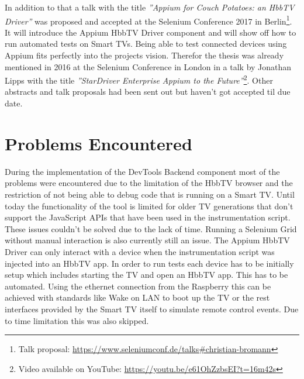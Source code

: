 In addition to that a talk with the title \textit{''Appium for Couch Potatoes: an HbbTV Driver''} was proposed and
accepted at the Selenium Conference 2017 in Berlin\footnote{Talk proposal: \url{https://www.seleniumconf.de/talks\#christian-bromann}}.
It will introduce the Appium HbbTV Driver component and will show off how to run automated tests on Smart TVs. Being
able to test connected devices using Appium fits perfectly into the projects vision. Therefor the thesis was already
mentioned in 2016 at the Selenium Conference in London in a talk by Jonathan Lipps with the title \textit{''StarDriver
Enterprise Appium to the Future''}\footnote{Video available on YouTube: \url{https://youtu.be/e61OhZzbsEI?t=16m42s}}.
Other abstracts and talk proposals had been sent out but haven't got accepted til due date.

\section{Problems Encountered\label{sec:problems}}


During the implementation of the DevTools Backend component most of the problems were encountered due to the limitation
of the HbbTV browser and the restriction of not being able to debug code that is running on a Smart TV. Until today
the functionality of the tool is limited for older TV generations that don't support the JavaScript APIs that have
been used in the instrumentation script. These issues couldn't be solved due to the lack of time. Running a Selenium
Grid without manual interaction is also currently still an issue. The Appium HbbTV Driver can only interact with a
device when the instrumentation script was injected into an HbbTV app. In order to run tests each device has to be
initially setup which includes starting the TV and open an HbbTV app. This has to be automated. Using the ethernet
connection from the Raspberry this can be achieved with standards like Wake on LAN to boot up the TV or the rest
interfaces provided by the Smart TV itself to simulate remote control events. Due to time limitation this was also
skipped.

